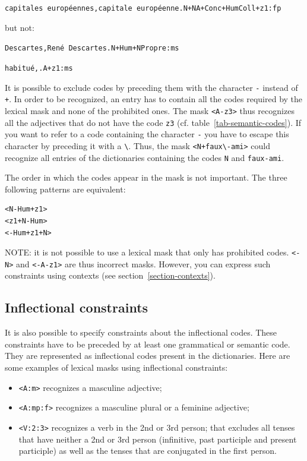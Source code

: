 \noindent
\texttt{capitales europ\'eennes,capitale europ\'eenne.N+NA+Conc+HumColl+z1:fp}

\bigskip
\noindent but not:

\bigskip
\noindent
\texttt{Descartes,Ren\'e Descartes.N+Hum+NPropre:ms}

\noindent
\texttt{habitu\'e,.A+z1:ms}

\bigskip
\noindent It is possible to exclude codes by preceding them with the character \verb+-+
instead of \verb$+$. In order to be recognized, an entry has to contain all the
codes required by the lexical mask and none of the prohibited ones. The mask
\verb$<A-z3>$ thus recognizes all the adjectives that do not have the code
\verb+z3+ (cf. table~\ref{tab-semantic-codes}).
If you want to refer to a code containing the character \verb$-$ you have to
escape this character by preceding it with a \verb+\+. Thus, the mask
\verb$<N+faux\-ami>$ could recognize all entries of the dictionaries containing
the codes \verb$N$ and \verb$faux-ami$.
\index{\verb+-+}

\bigskip
\noindent The order in which the codes appear in the mask is not important. The
three following patterns are equivalent:

\begin{verbatim}
<N-Hum+z1>
<z1+N-Hum>
<-Hum+z1+N>
\end{verbatim}

\bigskip
\noindent NOTE: it is not possible to use a lexical mask that only has
prohibited codes. \verb+<-N>+ and \verb+<-A-z1>+ are thus incorrect masks. 
However, you can express
such constraints using contexts (see section~\ref{section-contexts}).



\subsection{Inflectional constraints}
It is also possible to specify constraints about the inflectional codes. These
constraints have to be preceded by at least one grammatical or semantic code.
They are represented as inflectional codes present in the dictionaries.
Here are some examples of lexical masks using inflectional
constraints:

\bigskip
\begin{itemize}
  \item \verb+<A:m>+ recognizes a masculine adjective;
  \item \verb+<A:mp:f>+ recognizes a masculine plural or a feminine adjective;
  \item \verb+<V:2:3>+ recognizes a verb in the 2nd or 3rd person; that excludes
  all tenses that have neither a 2nd or 3rd person (infinitive, past participle
  and present participle) as well as the tenses that are conjugated in the first
  person.
\end{itemize}

